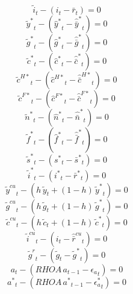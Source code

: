 \begin{dmath}
{{\tilde i}}_{t}-\left({{i}}_{t}-{{\bar r}}_{t}\right)=0
\end{dmath}
\begin{dmath}
{{\tilde y^*}}_{t}-\left({{\hat y^*}}_{t}-{{\hat {\bar y}^*}}_{t}\right)=0
\end{dmath}
\begin{dmath}
{{\tilde g^*}}_{t}-\left({{\hat g^*}}_{t}-{{\hat {\bar g}^*}}_{t}\right)=0
\end{dmath}
\begin{dmath}
{{\tilde c^*}}_{t}-\left({{\hat c^*}}_{t}-{{\hat {\bar c}^*}}_{t}\right)=0
\end{dmath}
\begin{dmath}
{{\tilde c^{H*}}}_{t}-\left({{\hat c^{H*}}}_{t}-{{\hat {\bar c}^{H*}}}_{t}\right)=0
\end{dmath}
\begin{dmath}
{{\tilde c^{F*}}}_{t}-\left({{\hat c^{F*}}}_{t}-{{\hat {\bar c}^{F*}}}_{t}\right)=0
\end{dmath}
\begin{dmath}
{{\tilde n^*}}_{t}-\left({{\hat n^*}}_{t}-{{\hat {\bar n}^*}}_{t}\right)=0
\end{dmath}
\begin{dmath}
{{\tilde f^*}}_{t}-\left({{\hat f^*}}_{t}-{{\hat {\bar f}^*}}_{t}\right)=0
\end{dmath}
\begin{dmath}
{{\tilde s^*}}_{t}-\left({{s^*}}_{t}-{{\bar s^*}}_{t}\right)=0
\end{dmath}
\begin{dmath}
{{\tilde i^*}}_{t}-\left({{i^*}}_{t}-{{\bar r^*}}_{t}\right)=0
\end{dmath}
\begin{dmath}
{{\tilde y^{cu}}}_{t}-\left({{h}}\, {{\tilde y}}_{t}+\left(1-{{h}}\right)\, {{\tilde y^*}}_{t}\right)=0
\end{dmath}
\begin{dmath}
{{\tilde g^{cu}}}_{t}-\left({{h}}\, {{\tilde g}}_{t}+\left(1-{{h}}\right)\, {{\tilde g^*}}_{t}\right)=0
\end{dmath}
\begin{dmath}
{{\tilde c^{cu}}}_{t}-\left({{h}}\, {{\tilde c}}_{t}+\left(1-{{h}}\right)\, {{\tilde c^*}}_{t}\right)=0
\end{dmath}
\begin{dmath}
{{\tilde i^{cu}}}_{t}-\left({{i}}_{t}-{{\hat {\bar r}^{cu}}}_{t}\right)=0
\end{dmath}
\begin{dmath}
{{\tilde g^{r}}}_{t}-\left({{\tilde g}}_{t}-{{\tilde g^*}}_{t}\right)=0
\end{dmath}
\begin{dmath}
{{a}}_{t}-\left({RHOA}\, {{a}}_{t-1}-{{\epsilon_a}}_{t}\right)=0
\end{dmath}
\begin{dmath}
{{a^*}}_{t}-\left({RHOA}\, {{a^*}}_{t-1}-{{\epsilon_a^*}}_{t}\right)=0
\end{dmath}
